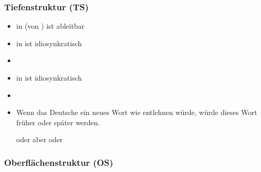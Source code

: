 
\begin{frame}
\frametitle{Tiefenstruktur (TS)}

\begin{itemize}
	\item \textipa{[t]} in \textipa{[\textscr a: t]} (von ) ist ableitbar
	\item {} in  ist idiosynkratisch
	\item[]
	\item {} in  ist idiosynkratisch
	\item[]
	\item Wenn das Deutsche ein neues Wort wie  \textipa{[k @ U d]} entlehnen würde, würde dieses Wort früher oder später  werden.
	
	\ea \textipa{[k O U t]} oder \textipa{[k o: t]} aber  oder  
	\z
	
\end{itemize}

\end{frame}



%
\subsubsection{Oberflächenstruktur (OS)}
%

